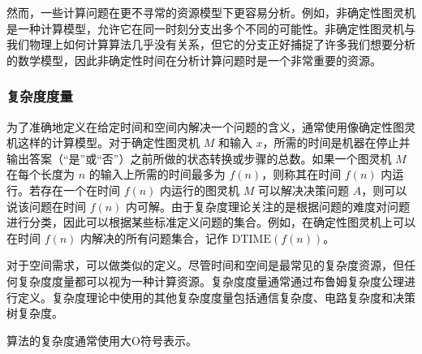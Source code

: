 然而，一些计算问题在更不寻常的资源模型下更容易分析。例如，非确定性图灵机是一种计算模型，允许它在同一时刻分支出多个不同的可能性。非确定性图灵机与我们物理上如何计算算法几乎没有关系，但它的分支正好捕捉了许多我们想要分析的数学模型，因此非确定性时间在分析计算问题时是一个非常重要的资源。
\subsubsection{复杂度度量 } 
为了准确地定义在给定时间和空间内解决一个问题的含义，通常使用像确定性图灵机这样的计算模型。对于确定性图灵机 \( M \) 和输入 \( x \)，所需的时间是机器在停止并输出答案（“是”或“否”）之前所做的状态转换或步骤的总数。如果一个图灵机 \( M \) 在每个长度为 \( n \) 的输入上所需的时间最多为 \( f(n) \)，则称其在时间 \( f(n) \) 内运行。若存在一个在时间 \( f(n) \) 内运行的图灵机 \( M \) 可以解决决策问题 \( A \)，则可以说该问题在时间 \( f(n) \) 内可解。由于复杂度理论关注的是根据问题的难度对问题进行分类，因此可以根据某些标准定义问题的集合。例如，在确定性图灵机上可以在时间 \( f(n) \) 内解决的所有问题集合，记作 \( \text{DTIME}(f(n)) \)。

对于空间需求，可以做类似的定义。尽管时间和空间是最常见的复杂度资源，但任何复杂度度量都可以视为一种计算资源。复杂度度量通常通过布鲁姆复杂度公理进行定义。复杂度理论中使用的其他复杂度度量包括通信复杂度、电路复杂度和决策树复杂度。

算法的复杂度通常使用大O符号表示。